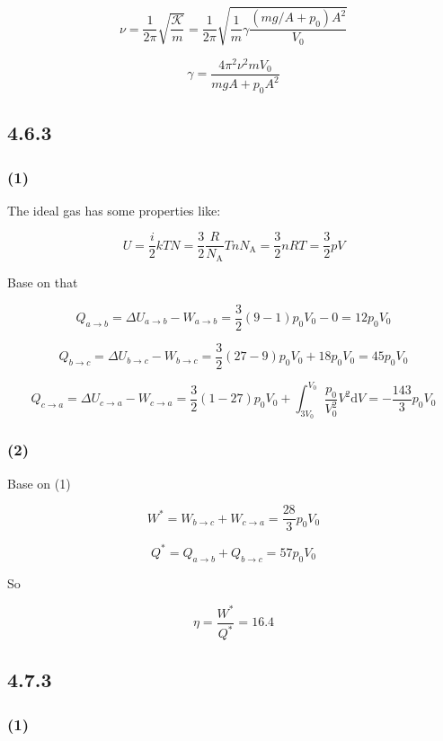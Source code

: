 \documentclass[a4paper,11pt]{amsart}
\theoremstyle{definition}
\begin{document}
	$$
	\nu =\frac{1}{2\pi}\sqrt{\frac{\mathcal{K}}{m}}=\frac{1}{2\pi}\sqrt{\frac{1}{m}\gamma \frac{\left( mg/A+p_0 \right) A^2}{V_0}}
	$$
	
	$$
	\gamma =\frac{4\pi ^2\nu ^2mV_0}{mgA+p_0A^2}
	$$
	
	\subsection*{4.6.3}
	
	\subsubsection*{(1)}
	
	The ideal gas has some properties like:
	
	$$
	U=\frac{i}{2}kTN=\frac{3}{2}\frac{R}{N_{\mathrm{A}}}TnN_{\mathrm{A}}=\frac{3}{2}nRT=\frac{3}{2}pV
	$$
	
	Base on that
	
	$$
	Q_{a\rightarrow b}=\Delta U_{a\rightarrow b}-W_{a\rightarrow b}=\frac{3}{2}\left( 9-1 \right) p_0V_0-0=12p_0V_0
	$$
	
	$$
	Q_{b\rightarrow c}=\Delta U_{b\rightarrow c}-W_{b\rightarrow c}=\frac{3}{2}\left( 27-9 \right) p_0V_0+18p_0V_0=45p_0V_0
	$$
	
	$$
	Q_{c\rightarrow a}=\Delta U_{c\rightarrow a}-W_{c\rightarrow a}=\frac{3}{2}\left( 1-27 \right) p_0V_0+\int_{3V_0}^{V_0}{\frac{p_0}{V_{0}^{2}}V^2\mathrm{d}V}=-\frac{143}{3}p_0V_0
	$$
	
	\subsubsection*{(2)}
	
	Base on (1)
	
	$$
	W^*=W_{b\rightarrow c}+W_{c\rightarrow a}=\dfrac{28}{3}p_0V_0
	$$
	
	$$
	Q^*=Q_{a\rightarrow b}+Q_{b\rightarrow c}=57p_0V_0
	$$
	
	So
	
	$$
	\eta=\dfrac{W^*}{Q^*}=16.4%
	$$
	
	\subsection*{4.7.3}
	
	\subsubsection*{(1)}
	
\end{document}
